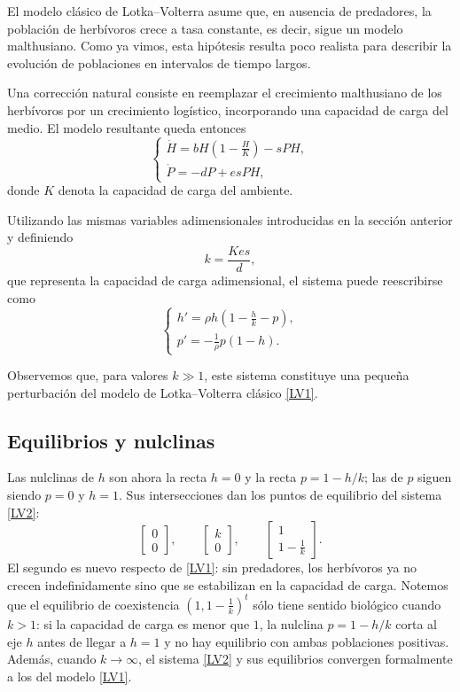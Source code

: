 \documentclass[12pt, a4paper]{amsbook}
\theoremstyle{remark}
\theoremstyle{definition}
\numberwithin{section}{chapter}
\numberwithin{subsection}{section}
\numberwithin{equation}{section}
\numberwithin{figure}{chapter}
\begin{document}
El modelo clásico de Lotka--Volterra asume que, en ausencia de predadores, la población de herbívoros crece a tasa constante, es decir, sigue un modelo malthusiano. Como ya vimos, esta hipótesis resulta poco realista para describir la evolución de poblaciones en intervalos de tiempo largos.

Una corrección natural consiste en reemplazar el crecimiento malthusiano de los herbívoros por un crecimiento logístico, incorporando una capacidad de carga del medio. El modelo resultante queda entonces
\begin{equation}\label{eq:LV-logistico}
\begin{cases}
\dot H = bH\left(1-\frac{H}{K}\right) - sPH,\\
\dot P = -dP + es PH,
\end{cases}
\end{equation}
donde $K$ denota la capacidad de carga del ambiente.


Utilizando las mismas variables adimensionales introducidas en la sección anterior y definiendo
$$
k = \frac{Kes}{d},
$$
que representa la capacidad de carga adimensional, el sistema puede reescribirse como
\begin{equation}\label{LV2}
\begin{cases}
\displaystyle h' = \rho h\left(1-\frac{h}{k}-p\right),\\[6pt]
p' = -\frac{1}{\rho}p(1-h).
\end{cases}
\end{equation}

Observemos que, para valores $k\gg 1$, este sistema constituye una pequeña perturbación del modelo de Lotka--Volterra clásico \eqref{LV1}.

\subsection*{Equilibrios y nulclinas}

Las nulclinas de $h$ son ahora la recta $h=0$ y la recta $p = 1 - h/k$; las de $p$ siguen siendo $p=0$ y $h=1$. Sus intersecciones dan los puntos de equilibrio del sistema \eqref{LV2}:
$$
\begin{bmatrix}
0\\
0
\end{bmatrix}, \qquad
\begin{bmatrix}
k\\
0
\end{bmatrix}, \qquad
\begin{bmatrix}
1\\
1-\frac{1}{k}
\end{bmatrix}.
$$
El segundo es nuevo respecto de \eqref{LV1}: sin predadores, los herbívoros ya no crecen indefinidamente sino que se estabilizan en la capacidad de carga. Notemos que el equilibrio de coexistencia $\left(1,1-\frac{1}{k}\right)^t$ sólo tiene sentido biológico cuando $k>1$: si la capacidad de carga es menor que $1$, la nulclina $p=1-h/k$ corta al eje $h$ antes de llegar a $h=1$ y no hay equilibrio con ambas poblaciones positivas. Además, cuando $k\to\infty$, el sistema \eqref{LV2} y sus equilibrios convergen formalmente a los del modelo \eqref{LV1}.
\end{document}
